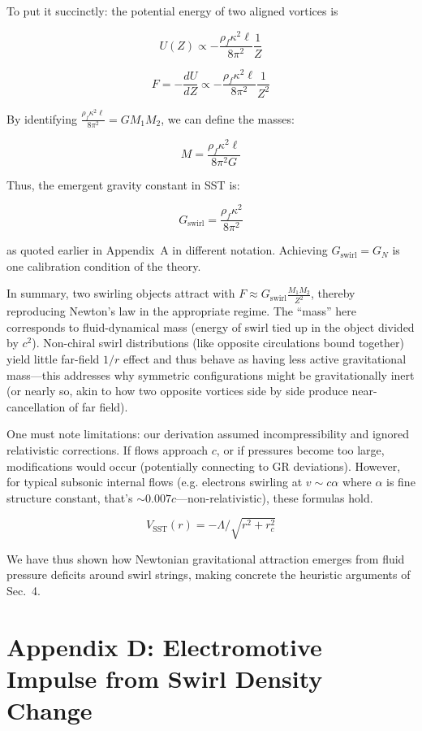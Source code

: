 \documentclass[10pt,reprint,aps,onecolumn,nofootinbib]{revtex4-2}
\newcommand{\rc}{r_c}                                    %
\providecommand{\rc}{r_c}
\newcommand{\rhoF}{\rho_{\!f}}     %
\begin{document}
To put it succinctly: the potential energy of two aligned vortices is


\[
U(Z) \propto -\frac{\rhoF \kappa^2 \ell}{8\pi^2}\frac{1}{Z}
\]


\[
F = -\frac{dU}{dZ} \propto -\frac{\rhoF \kappa^2 \ell}{8\pi^2}\frac{1}{Z^2}
\]


By identifying $\frac{\rhoF \kappa^2 \ell}{8\pi^2} = G M_1 M_2$, we can define the masses:


\[
M = \frac{\rhoF \kappa^2 \ell}{8\pi^2 G}
\]


Thus, the emergent gravity constant in SST is:

\begin{equation}
G_{\text{swirl}} = \frac{\rhoF \kappa^2}{8\pi^2}
\label{eq:Gswirl}
\end{equation}

as quoted earlier in Appendix~A in different notation. Achieving $G_{\text{swirl}}=G_N$ is one calibration condition of the theory.


In summary, two swirling objects attract with $F \approx G_{\text{swirl}} \frac{M_1 M_2}{Z^2}$, thereby reproducing Newton’s law in the appropriate regime. The “mass” here corresponds to fluid-dynamical mass (energy of swirl tied up in the object divided by $c^2$). Non-chiral swirl distributions (like opposite circulations bound together) yield little far-field $1/r$ effect and thus behave as having less active gravitational mass—this addresses why symmetric configurations might be gravitationally inert (or nearly so, akin to how two opposite vortices side by side produce near-cancellation of far field).


One must note limitations: our derivation assumed incompressibility and ignored relativistic corrections. If flows approach $c$, or if pressures become too large, modifications would occur (potentially connecting to GR deviations). However, for typical subsonic internal flows (e.g. electrons swirling at $v \sim c\alpha$ where $\alpha$ is fine structure constant, that’s $\sim 0.007c$—non-relativistic), these formulas hold.


\[
V_{\text{SST}}(r) = -\Lambda/\sqrt{r^2 + \rc^2}
\]

We have thus shown how Newtonian gravitational attraction emerges from fluid pressure deficits around swirl strings, making concrete the heuristic arguments of Sec.~4.


\section*{Appendix D: Electromotive Impulse from Swirl Density Change}
\end{document}
